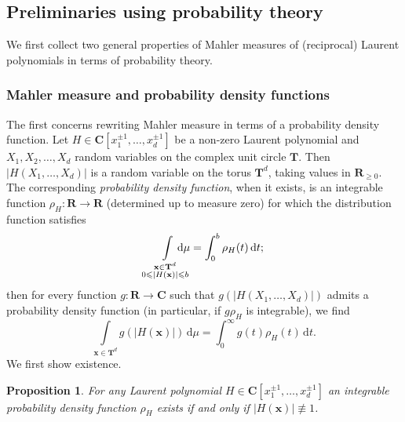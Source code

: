 \documentclass[12pt,reqno]{amsart}
\theoremstyle{definition}
\theoremstyle{plain}
\newtheorem{proposition}[theorem]{Proposition}
\theoremstyle{definition}
\newcommand{\R}{\mathbf{R}}
\newcommand{\Cc}{\mathbf{C}}
\newcommand{\T}{\mathbf{T}}
\renewcommand{\geq}{\geqslant}
\renewcommand{\leq}{\leqslant}
\renewcommand{\d}{\mathrm{d}}
\begin{document}
\subsection{Preliminaries using probability theory}
We first collect two general properties of Mahler measures of (reciprocal) Laurent polynomials in terms of probability theory. 

\subsubsection*{Mahler measure and probability density functions} The first concerns rewriting Mahler measure in terms of a probability density function. Let $H \in \Cc[x_1^{\pm 1}, \ldots, x_{d}^{\pm 1}]$ be a non-zero Laurent polynomial and $X_1, X_2, \ldots, X_d$ random variables on the complex unit circle $\T$. Then $|H(X_1, \ldots, X_d)|$ is a random variable on the torus $\T^d$, taking values in $\R_{\geq 0}$. The corresponding \emph{probability density function}, when it exists, is an integrable function $\rho_H \colon \R \rightarrow \R$ (determined up to measure zero) for which the distribution function satisfies 
\begin{equation} \label{defrhogen} \int\limits_{\substack{ \mathbf x \in \T^d \\ 0 \leq |H(\mathbf x)| \leq b}} \hspace*{-5mm} \d \mu= \int_0^b \rho_H(t) \, \d t; \end{equation} 
then for every function $g \colon \R \rightarrow \Cc$ such that $g(|H(X_1,\dots,X_d)|)$ admits a probability density function (in particular, if $g \rho_H$ is integrable), we find 
\begin{equation} \label{pdfprope} \int\limits_{\mathbf x \in \T^d} g(|H(\mathbf x)|) \, \d \mu= \int_0^\infty g(t) \rho_H(t) \, \d t.  \end{equation} We first show existence. 


\begin{proposition} For any Laurent polynomial $H \in \Cc[x_1^{\pm 1}, \ldots, x_{d}^{\pm 1}]$ an integrable probability density function $\rho_H$ exists if and only if $|H(\mathbf x)| \not\equiv 1$. 
\end{proposition} 
\end{document}
